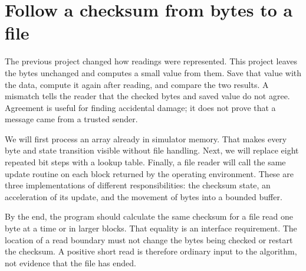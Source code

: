 \section{Follow a checksum from bytes to a file}
The previous project changed how readings were represented. This project leaves the
bytes unchanged and computes a small value from them. Save that value with the data,
compute it again after reading, and compare the two results. A mismatch tells the
reader that the checked bytes and saved value do not agree. Agreement is useful for
finding accidental damage; it does not prove that a message came from a trusted sender.

We will first process an array already in simulator memory. That makes every byte and
state transition visible without file handling. Next, we will replace eight repeated
bit steps with a lookup table. Finally, a file reader will call the same update routine
on each block returned by the operating environment. These are three implementations
of different responsibilities: the checksum state, an acceleration of its update, and
the movement of bytes into a bounded buffer.

By the end, the program should calculate the same checksum for a file read one byte
at a time or in larger blocks. That equality is an interface requirement. The location
of a read boundary must not change the bytes being checked or restart the checksum.
A positive short read is therefore ordinary input to the algorithm, not evidence
that the file has ended.
